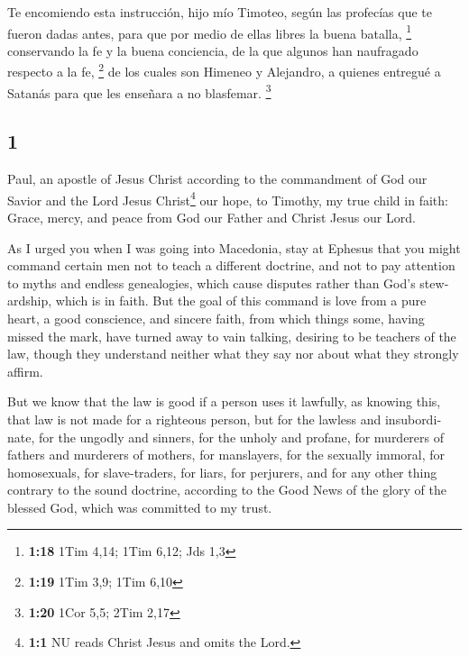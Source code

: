 \begin{paracol}{2}
 Te encomiendo esta instrucción, hijo mío Timoteo, según
las profecías que te fueron dadas antes, para que por medio de ellas
libres la buena batalla, \footnote{\textbf{1:18} 1Tim 4,14; 1Tim 6,12;
  Jds 1,3}  conservando la fe y la buena conciencia, de
la que algunos han naufragado respecto a la fe, \footnote{\textbf{1:19}
  1Tim 3,9; 1Tim 6,10}  de los cuales son Himeneo y
Alejandro, a quienes entregué a Satanás para que les enseñara a no
blasfemar. \footnote{\textbf{1:20} 1Cor 5,5; 2Tim 2,17}

\switchcolumn
\begin{otherlanguage}{english}

\hypertarget{section-1}{%
\section{1}\label{section-1}}

 Paul, an apostle of Jesus Christ according to the
commandment of God our Savior and the Lord Jesus Christ\footnote{\textbf{1:1}
  NU reads Christ Jesus and omits the Lord.} our hope,  to
Timothy, my true child in faith: Grace, mercy, and peace from God our
Father and Christ Jesus our Lord.

 As I urged you when I was going into Macedonia, stay at
Ephesus that you might command certain men not to teach a different
doctrine,  and not to pay attention to myths and endless
genealogies, which cause disputes rather than God's stewardship, which
is in faith.  But the goal of this command is love from a
pure heart, a good conscience, and sincere faith,  from
which things some, having missed the mark, have turned away to vain
talking,  desiring to be teachers of the law, though they
understand neither what they say nor about what they strongly affirm.

 But we know that the law is good if a person uses it
lawfully,  as knowing this, that law is not made for a
righteous person, but for the lawless and insubordinate, for the ungodly
and sinners, for the unholy and profane, for murderers of fathers and
murderers of mothers, for manslayers,  for the sexually
immoral, for homosexuals, for slave-traders, for liars, for perjurers,
and for any other thing contrary to the sound doctrine, 
according to the Good News of the glory of the blessed God, which was
committed to my trust.


\end{otherlanguage}
\end{paracol}
